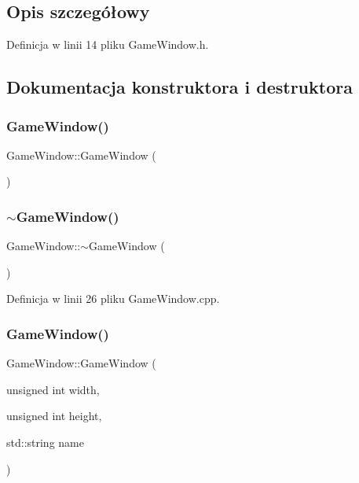 \subsection{Opis szczegółowy}


Definicja w linii 14 pliku Game\+Window.\+h.



\subsection{Dokumentacja konstruktora i destruktora}
\mbox{\label{class_game_window_aeb8fe4d63cdd9e9d3e6fdcb35d15a37c}} 
\subsubsection{\texorpdfstring{Game\+Window()}{GameWindow()}\hspace{0.1cm}{\footnotesize\ttfamily [1/2]}}
{\footnotesize\ttfamily Game\+Window\+::\+Game\+Window (\begin{DoxyParamCaption}{ }\end{DoxyParamCaption})\hspace{0.3cm}{\ttfamily [delete]}}

\mbox{\label{class_game_window_a55b071c0390e45c064a160c1e6baaa08}} 
\subsubsection{\texorpdfstring{$\sim$\+Game\+Window()}{~GameWindow()}}
{\footnotesize\ttfamily Game\+Window\+::$\sim$\+Game\+Window (\begin{DoxyParamCaption}{ }\end{DoxyParamCaption})}



Definicja w linii 26 pliku Game\+Window.\+cpp.

\mbox{\label{class_game_window_a22da49d930c2fd26888b223049a9da18}} 
\subsubsection{\texorpdfstring{Game\+Window()}{GameWindow()}\hspace{0.1cm}{\footnotesize\ttfamily [2/2]}}
{\footnotesize\ttfamily Game\+Window\+::\+Game\+Window (\begin{DoxyParamCaption}\item[{unsigned int}]{width,  }\item[{unsigned int}]{height,  }\item[{std\+::string}]{name }\end{DoxyParamCaption})}



